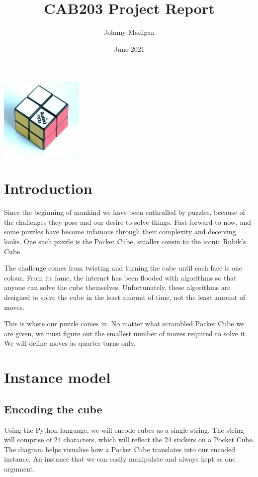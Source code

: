 \documentclass[a4paper]{article}
\title{CAB203 Project Report\vspace{-3ex}}
\author{Johnny Madigan}
\date{\vspace{-3ex}June 2021\vspace{20ex}}
\begin{document}
\maketitle
\begin{center}
\includegraphics[width=4cm]{rubik.jpg}
\end{center}
\newpage
\tableofcontents
\newpage

\section{Introduction}\label{sec:introduction}
\par Since the beginning of mankind we have been enthralled by puzzles, because of the challenges they pose and our desire to solve things. Fast-forward to now, and some puzzles have become infamous through their complexity and deceiving looks. One such puzzle is the Pocket Cube, smaller cousin to the iconic Rubik’s Cube.

\par The challenge comes from twisting and turning the cube until each face is one colour. From its fame, the internet has been flooded with algorithms so that anyone can solve the cube themselves. Unfortunately, these algorithms are designed to solve the cube in the least amount of time, not the least amount of moves.

\par This is where our puzzle comes in. No matter what scrambled Pocket Cube we are given, we must figure out the smallest number of moves required to solve it. We will define moves as quarter turns only.

\section{Instance model}\label{sec:instance}
\subsection{Encoding the cube}
\par Using the Python language, we will encode cubes as a single string. The string will comprise of 24 characters, which will reflect the 24 stickers on a Pocket Cube. The diagram helps visualise how a Pocket Cube translates into our encoded instance. An instance that we can easily manipulate and always kept as one argument.
\end{document}
